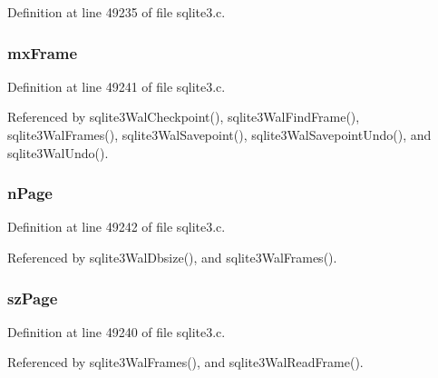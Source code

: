 Definition at line 49235 of file sqlite3.\+c.

\hypertarget{struct_wal_index_hdr_aec0fb4e633de5771ed7053861905c846}{}
\subsubsection[{mx\+Frame}]{ mx\+Frame}\label{struct_wal_index_hdr_aec0fb4e633de5771ed7053861905c846}


Definition at line 49241 of file sqlite3.\+c.



Referenced by sqlite3\+Wal\+Checkpoint(), sqlite3\+Wal\+Find\+Frame(), sqlite3\+Wal\+Frames(), sqlite3\+Wal\+Savepoint(), sqlite3\+Wal\+Savepoint\+Undo(), and sqlite3\+Wal\+Undo().

\hypertarget{struct_wal_index_hdr_a6b939842a27dd6c712b8a6f878bd0e89}{}
\subsubsection[{n\+Page}]{ n\+Page}\label{struct_wal_index_hdr_a6b939842a27dd6c712b8a6f878bd0e89}


Definition at line 49242 of file sqlite3.\+c.



Referenced by sqlite3\+Wal\+Dbsize(), and sqlite3\+Wal\+Frames().

\hypertarget{struct_wal_index_hdr_ab53b7daf2abd446d856245f8a9c809b0}{}
\subsubsection[{sz\+Page}]{ sz\+Page}\label{struct_wal_index_hdr_ab53b7daf2abd446d856245f8a9c809b0}


Definition at line 49240 of file sqlite3.\+c.



Referenced by sqlite3\+Wal\+Frames(), and sqlite3\+Wal\+Read\+Frame().

\hypertarget{struct_wal_index_hdr_a4884baf6a3e410b581a16e00353028b6}{}
